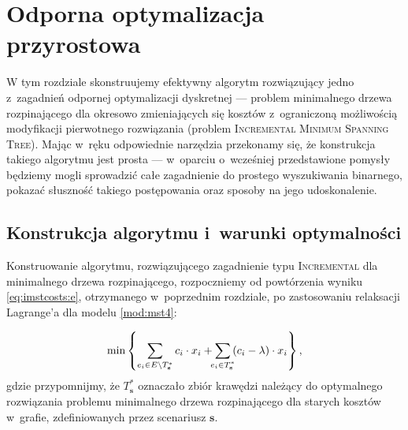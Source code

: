 \chapter{Odporna optymalizacja przyrostowa}\label{ch:binaryIncMST}
\thispagestyle{chapterBeginStyle}





W tym rozdziale skonstruujemy efektywny algorytm rozwiązujący jedno z~zagadnień odpornej optymalizacji dyskretnej --- problem minimalnego drzewa rozpinającego dla okresowo zmieniających się kosztów z~ograniczoną możliwością modyfikacji pierwotnego rozwiązania (problem \textsc{Incremental Minimum Spanning Tree}).
Mając w~ręku odpowiednie narzędzia przekonamy się, że konstrukcja takiego algorytmu jest prosta --- w~oparciu o~wcześniej przedstawione pomysły będziemy mogli sprowadzić całe zagadnienie do prostego wyszukiwania binarnego, pokazać słuszność takiego postępowania oraz sposoby na jego udoskonalenie.




\section{Konstrukcja algorytmu i~warunki optymalności}




Konstruowanie algorytmu, rozwiązującego zagadnienie typu \textsc{Incremental} dla minimalnego drzewa rozpinającego, rozpoczniemy od powtórzenia wyniku \ref{eq:imstcosts:e}, otrzymanego w~poprzednim rozdziale, po zastosowaniu relaksacji Lagrange'a dla modelu \ref{mod:mst4}:

\begin{eqnarray}\label{eq:imstcosts2}
	\min \left\{ \sum_{e_{i} \in E \setminus T^{\ast}_{\textbf{s}}} c_{i} \cdot x_{i} + \sum_{\mathclap{e_{i} \in T^{\ast}_{\textbf{s}}}} \left( c_{i} - \lambda \right) \cdot x_{i} \right\}\text{,}
\end{eqnarray}
gdzie przypomnijmy, że $T^{\ast}_{\textbf{s}}$ oznaczało zbiór krawędzi należący do optymalnego rozwiązania problemu minimalnego drzewa rozpinającego dla starych kosztów w~grafie, zdefiniowanych przez scenariusz $\textbf{s}$.

